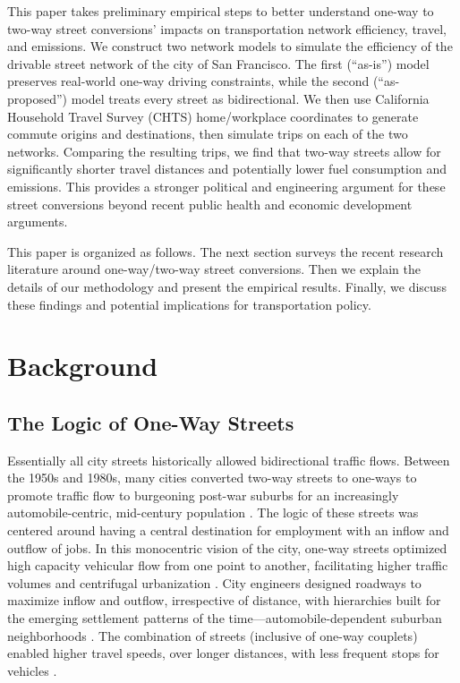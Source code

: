 \documentclass{trbunofficial}
\begin{document}
This paper takes preliminary empirical steps to better understand one-way to two-way street conversions' impacts on transportation network efficiency, travel, and emissions. We construct two network models to simulate the efficiency of the drivable street network of the city of San Francisco. The first (\enquote{as-is}) model preserves real-world one-way driving constraints, while the second (\enquote{as-proposed}) model treats every street as bidirectional. We then use California Household Travel Survey (CHTS) home/workplace coordinates to generate commute origins and destinations, then simulate trips on each of the two networks. Comparing the resulting trips, we find that two-way streets allow for significantly shorter travel distances and potentially lower fuel consumption and emissions. This provides a stronger political and engineering argument for these street conversions beyond recent public health and economic development arguments.

This paper is organized as follows. The next section surveys the recent research literature around one-way/two-way street conversions. Then we explain the details of our methodology and present the empirical results. Finally, we discuss these findings and potential implications for transportation policy.

\section{Background}

\subsection{The Logic of One-Way Streets}

Essentially all city streets historically allowed bidirectional traffic flows. Between the 1950s and 1980s, many cities converted two-way streets to one-ways to promote traffic flow to burgeoning post-war suburbs for an increasingly automobile-centric, mid-century population \cite{appleyard_livable_1980,hall_cities_1996,handy_planning_2003,jackson_crabgrass_1987}. The logic of these streets was centered around having a central destination for employment with an inflow and outflow of jobs. In this monocentric vision of the city, one-way streets optimized high capacity vehicular flow from one point to another, facilitating higher traffic volumes and centrifugal urbanization \cite{dover_street_2013}. City engineers designed roadways to maximize inflow and outflow, irrespective of distance, with hierarchies built for the emerging settlement patterns of the time---automobile-dependent suburban neighborhoods \cite{buchanan_traffic_1963,bavarez_traffic_1967}. The combination of streets (inclusive of one-way couplets) enabled higher travel speeds, over longer distances, with less frequent stops for vehicles \cite{hebbert_engineering_2005}.
\end{document}
